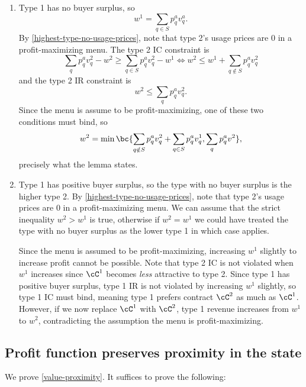     \begin{enumerate}
        \item[\tbf{Case 1.}] Type 1 has no buyer surplus, so $$w^1 = \sum_{q\in S} p^a_q v^a_q.$$ By \cref{highest-type-no-usage-prices}, note that type 2's usage prices are 0 in a profit-maximizing menu. The type 2 IC constraint is $$\sum_q p^a_q v^2_q - w^2 \ge \sum_{q\in S} p^a_q v^2_q - w^1 \iff w^2 \le w^1 + \sum_{q\notin S} p^a_q v^2_q$$ and the type 2 IR constraint is $$w^2 \le \sum_q p^a_q v^2_q.$$ Since the menu is assume to be profit-maximizing, one of these two conditions must bind, so $$w^2 = \min \bc{\sum_{q\notin S} p^a_q v^2_q + \sum_{q\in S} p^a_q v^1_q, \sum_q p^a_q v^2},$$ precisely what the lemma states.


        \item[\tbf{Case 2.}] Type 1 has positive buyer surplus, so the type with no buyer surplus is the higher type 2. By \cref{highest-type-no-usage-prices}, note that type 2's usage prices are 0 in a profit-maximizing menu. We can assume that the strict inequality $w^2 > w^1$ is true, otherwise if $w^2 = w^1$ we could have treated the type with no buyer surplus as the lower type 1 in which case  applies.

        Since the menu is assumed to be profit-maximizing, increasing $w^1$ slightly to increase profit cannot be possible. Note that type 2 IC is not violated when $w^1$ increases since $\cC^1$ becomes \emph{less} attractive to type 2. Since type 1 has positive buyer surplus, type 1 IR is not violated by increasing $w^1$ slightly, so type 1 IC must bind, meaning type 1 prefers contract $\cC^2$ as much as $\cC^1$. However, if we now replace $\cC^1$ with $\cC^2$, type 1 revenue increases from $w^1$ to $w^2$, contradicting the assumption the menu is profit-maximizing.
        
    \end{enumerate}
    
\subsection{Profit function preserves proximity in the state} \label{value-is-proximity}

    We prove \cref{value-proximity}. It suffices to prove the following:
    
